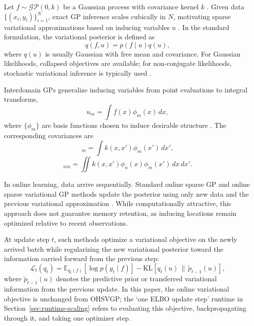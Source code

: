 \documentclass{article}
\theoremstyle{plain}
\theoremstyle{definition}
\theoremstyle{remark}
\begin{document}
Let $f \sim \mathcal{GP}(0,k)$ be a Gaussian process with covariance kernel $k$ \citep{Rasmussen2006}. Given data $\{(x_i,y_i)\}_{i=1}^N$, exact GP inference scales cubically in $N$, motivating sparse variational approximations based on inducing variables $u$ \citep{Titsias2009,Hensman2013}. In the standard formulation, the variational posterior is defined as
\begin{equation}
q(f,u)=p(f \mid u)q(u),
\end{equation}
where $q(u)$ is usually Gaussian with free mean and covariance. For Gaussian likelihoods, collapsed objectives are available; for non-conjugate likelihoods, stochastic variational inference is typically used \citep{Hensman2015}.

Interdomain GPs generalize inducing variables from point evaluations to integral transforms,
\begin{equation}
u_m = \int f(x)\phi_m(x)\,dx,
\end{equation}
where $\{\phi_m\}$ are basis functions chosen to induce desirable structure \citep{LazaroGredilla2009,VanderWilk2020}. The corresponding covariances are
\begin{equation}
[K_{fu}]_m = \int k(x,x')\phi_m(x')\,dx',
\end{equation}
\begin{equation}
[K_{uu}]_{nm} = \iint k(x,x')\phi_n(x)\phi_m(x')\,dx\,dx'.
\end{equation}

In online learning, data arrive sequentially. Standard online sparse GP and online sparse variational GP methods update the posterior using only new data and the previous variational approximation \citep{Csato2002,Bui2017,Maddox2021}. While computationally attractive, this approach does not guarantee memory retention, as inducing locations remain optimized relative to recent observations.

At update step $t$, such methods optimize a variational objective on the newly arrived batch while regularizing the new variational posterior toward the information carried forward from the previous step:
\begin{equation}
\mathcal{L}_t(q_t)
=
\mathbb{E}_{q_t(f)}\!\left[\log p(y_t \mid f)\right]
-
\mathrm{KL}\!\left[q_t(u)\,\|\,\widetilde{p}_{t-1}(u)\right],
\end{equation}
where $\widetilde{p}_{t-1}(u)$ denotes the predictive prior or transferred variational information from the previous update. In this paper, the online variational objective is unchanged from OHSVGP; the `one ELBO update step' runtime in Section~\ref{sec:runtime-scaling} refers to evaluating this objective, backpropagating through it, and taking one optimizer step.
\end{document}
